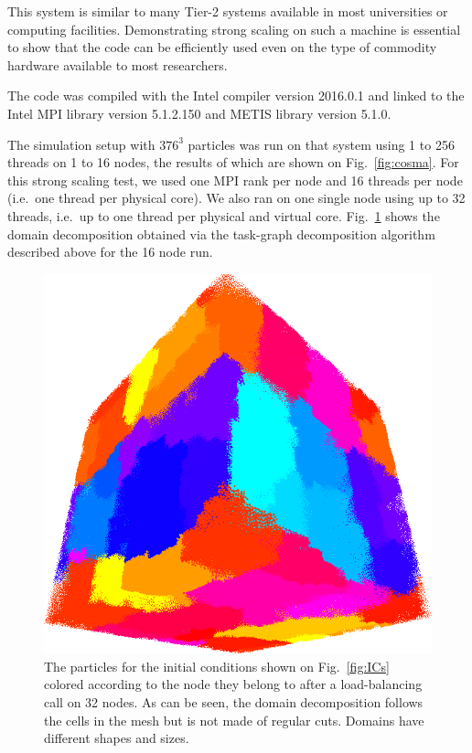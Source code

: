 \documentclass{sig-alternate-05-2015}
\begin{document}
This system is similar to many Tier-2 systems available in most universities or
computing facilities. Demonstrating strong scaling on such a machine is
essential to show that the code can be efficiently used even on the type of
commodity hardware available to most researchers.

The code was compiled with the Intel compiler version \textsc{2016.0.1} and
linked to the Intel MPI library version \textsc{5.1.2.150} and METIS library
version \textsc{5.1.0}.

The simulation setup with $376^3$ particles was run on that system using 1 to
256 threads on 1 to 16 nodes, the results of which are shown on
Fig.~\ref{fig:cosma}. For this strong scaling test, we used one MPI rank per node and 16
threads per node (i.e.~one thread per physical core). We also ran on one single
node using up to 32 threads, i.e.~up to one thread per physical and
virtual core. Fig.~\ref{fig:domains} shows the domain decomposition
obtained via the task-graph decomposition algorithm described above for
the 16 node run.

\begin{figure}
\centering
\includegraphics[width=\columnwidth]{Figures/domains}
\caption{The particles for the initial conditions shown on Fig.~\ref{fig:ICs}
  colored according to the node they belong to after a load-balancing call on
  32 nodes. As can be seen, the domain decomposition follows the cells in the mesh
  but is not made of regular cuts. Domains have different shapes and
  sizes. \label{fig:domains}}
\end{figure}  
\end{document}
